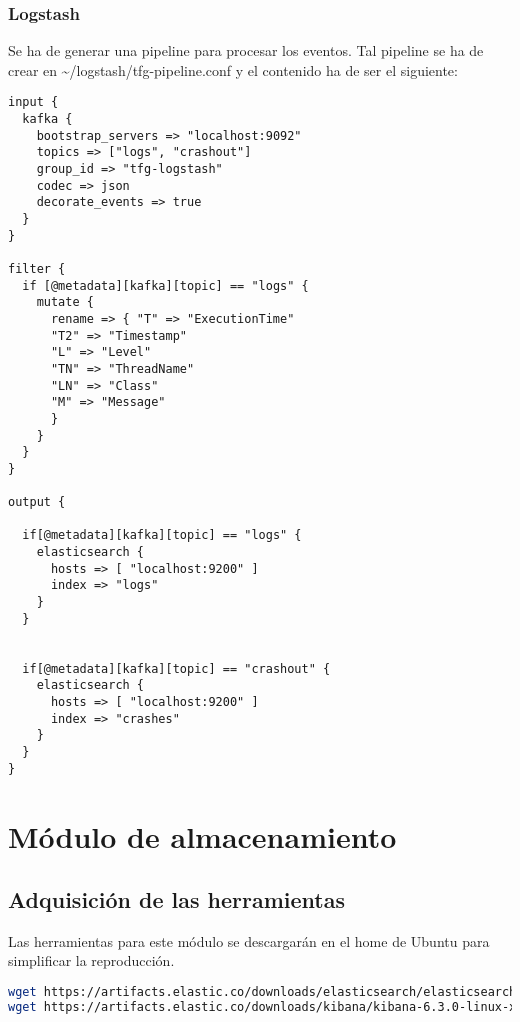 \subsubsection{Logstash}
Se ha de generar una pipeline para procesar los eventos. Tal pipeline se ha de crear en \textasciitilde/logstash/tfg-pipeline.conf y el contenido ha de ser el siguiente:

\begin{lstlisting}
input {
  kafka {
    bootstrap_servers => "localhost:9092"
    topics => ["logs", "crashout"]
    group_id => "tfg-logstash"
    codec => json
    decorate_events => true
  }
}

filter {
  if [@metadata][kafka][topic] == "logs" {
    mutate {
      rename => { "T" => "ExecutionTime"
      "T2" => "Timestamp"
      "L" => "Level"
      "TN" => "ThreadName"
      "LN" => "Class"
      "M" => "Message"
      }
    }
  }
}

output {

  if[@metadata][kafka][topic] == "logs" {
    elasticsearch {
      hosts => [ "localhost:9200" ]
      index => "logs"
    }
  }


  if[@metadata][kafka][topic] == "crashout" {
    elasticsearch {
      hosts => [ "localhost:9200" ]
      index => "crashes"
    }
  }
}
\end{lstlisting}


\section{Módulo de almacenamiento}
\subsection{Adquisición de las herramientas}
Las herramientas para este módulo se descargarán en el home de Ubuntu para simplificar la reproducción.
\begin{lstlisting}[language=Bash, breaklines=true]
wget https://artifacts.elastic.co/downloads/elasticsearch/elasticsearch-6.3.0.tar.gz
wget https://artifacts.elastic.co/downloads/kibana/kibana-6.3.0-linux-x86_64.tar.gz
\end{lstlisting}

